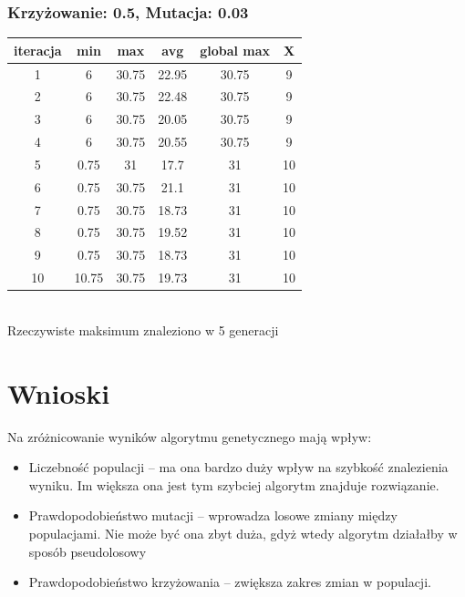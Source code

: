 \documentclass[a4paper,11pt]{article}
\begin{document}
				\subsubsection{Krzyżowanie: 0.5, Mutacja: 0.03}
				\begin{tabular}{|c|c|c|c|c|c|}
					\hline 
					iteracja &  min &  max & avg & global max &  X\\
					\hline
					1 & 6 & 30.75 & 22.95 & 30.75 & 9\\
					\hline
					2 & 6 & 30.75 & 22.48 & 30.75 & 9\\
					\hline
					3 & 6 & 30.75 & 20.05 & 30.75 & 9\\
					\hline
					4 & 6 & 30.75 & 20.55 & 30.75 & 9\\
					\hline
					5 & 0.75 & 31 & 17.7 & 31 & 10\\
					\hline
					6 & 0.75 & 30.75 & 21.1 & 31 & 10\\
					\hline
					7 & 0.75 & 30.75 & 18.73 & 31 & 10\\
					\hline
					8 & 0.75 & 30.75 & 19.52 & 31 & 10\\
					\hline
					9 & 0.75 & 30.75 & 18.73 & 31 & 10\\
					\hline
					10 & 10.75 & 30.75 & 19.73 & 31 & 10\\
					\hline
				\end{tabular} \\
				Rzeczywiste maksimum znaleziono w 5 generacji
	\section{Wnioski}
	Na zróżnicowanie wyników algorytmu genetycznego mają wpływ:
	\begin{itemize}
		\item Liczebność populacji -- ma ona bardzo duży wpływ na szybkość znalezienia wyniku. Im większa ona jest tym szybciej algorytm znajduje rozwiązanie.
		\item Prawdopodobieństwo mutacji -- wprowadza losowe zmiany między populacjami. Nie może być ona zbyt duża, gdyż wtedy algorytm działałby w sposób pseudolosowy
		\item Prawdopodobieństwo krzyżowania -- zwiększa zakres zmian w populacji.
	\end{itemize}
	
	
	
\end{document}
